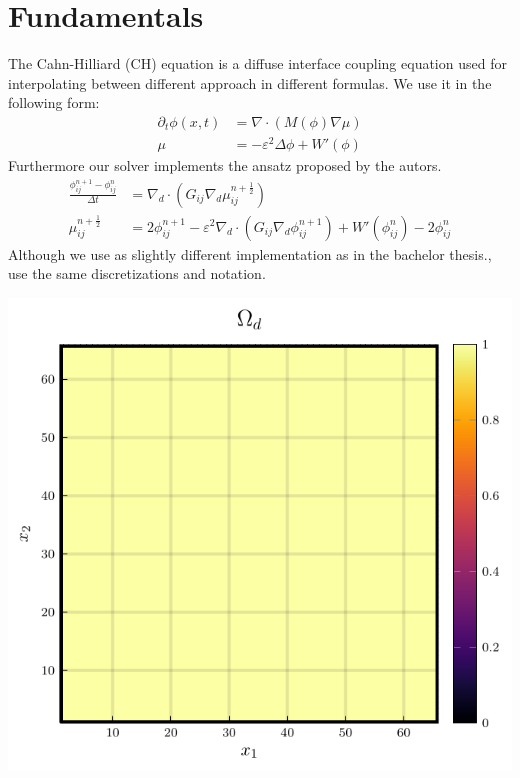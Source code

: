 \documentclass{mimosis}
\begin{document}
\chapter{Fundamentals}
\label{sec:orgc2bdf70}
The Cahn-Hilliard (CH) equation is a diffuse interface coupling equation used for interpolating between different approach in different formulas. We use it in the following form:
\begin{equation}
\begin{aligned}
\partial_{t}\phi(x,t) &=  \nabla \cdot(M(\phi)\nabla\mu) \\
\mu &= - \varepsilon^2 \Delta\phi  + W'(\phi)
\end{aligned}
\end{equation}
Furthermore our solver implements the ansatz proposed by the autors\autocite{SHIN20117441}.
\begin{equation}
\label{eq:ansatz}
\begin{aligned}
\frac{\phi_{ij}^{n+1} - \phi_{ij}^n}{\Delta t}  &=  \nabla _d \cdot (G_{ij} \nabla_d \mu_{ij}^{n+\frac{1}{2}} )  \\
 \mu_{ij}^{n+\frac{1}{2}} &= 2\phi_{ij}^{n+1} - \varepsilon^2  \nabla_d \cdot  (G_{ij} \nabla _d \phi_{ij}^{n+1} ) + W'(\phi_{ij}^n) - 2\phi _{ij}^n
\end{aligned}
\end{equation}
Although we use as slightly different implementation as in the bachelor thesis\autocite{Ulmer_CHRelaxed_2024}.,  use the same discretizations and notation.

\begin{center}
\includegraphics[width=.9\linewidth]{images/domain.png}
\label{}
\end{center}
\end{document}
